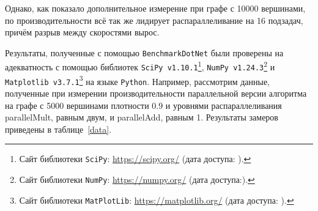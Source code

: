 \begin{table}[h]
\centering
    \caption{Сравнение производительности алгоритма обхода в ширину при распараллеливании на 16 и 64 подзадачи для функции умножения. Графа \texttt{SpeedUp} показывает отношение скорости работы алгоритма при 64 подзадачах к скорости работы при 16 подзадачах.}
    \label{bfsmaxgraph}
\end{table}

Однако, как показало дополнительное измерение при графе с 10000 вершинами, по производительности всё так же лидирует распараллеливание на 16 подзадач, причём разрыв между скоростями вырос.

Результаты, полученные с помощью \texttt{BenchmarkDotNet} были проверены на адекватность с помощью библиотек \texttt{SciPy v1.10.1}\footnote{Сайт библиотеки \texttt{SciPy}: \url{https://scipy.org/} (дата доступа:   ).}, \texttt{NumPy v1.24.3}\footnote{Сайт библиотеки \texttt{NumPy}: \url{https://numpy.org/} (дата доступа:).} и \texttt{Matplotlib v3.7.1}\footnote{Сайт библиотеки \texttt{MatPlotLib}: \url{https://matplotlib.org/} (дата доступа:   ).} на языке \texttt{Python}. Например, рассмотрим данные, полученные при измерении производительности параллельной версии алгоритма на графе с 5000 вершинами плотности $0.9$ и уровнями распараллеливания parallelMult, равным двум, и parallelAdd, равным 1. Результаты замеров приведены в таблице~\ref{data}. 

